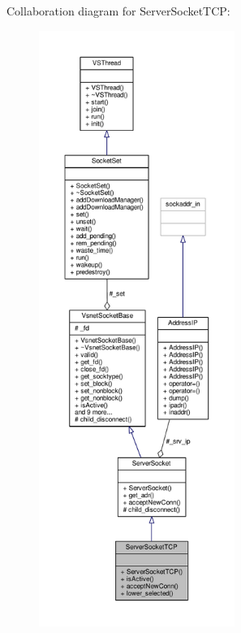 Collaboration diagram for Server\+Socket\+T\+CP\+:
\nopagebreak
\begin{figure}[H]
\begin{center}
\leavevmode
\includegraphics[height=550pt]{db/df3/classServerSocketTCP__coll__graph}
\end{center}
\end{figure}
